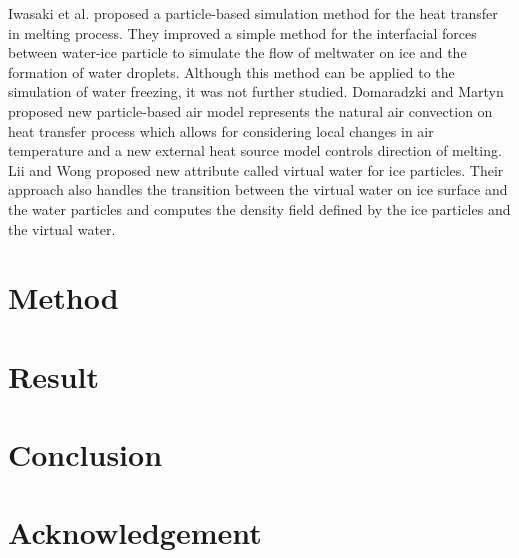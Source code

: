 \documentclass[10pt, twocolumn] {IEEEtran}
\begin{document}
 Iwasaki et al.\cite{iwasaki2010fast} proposed a particle-based simulation method for the heat transfer in melting process. They improved a simple method for the interfacial forces between water-ice particle to simulate the flow of meltwater on ice and the formation of water droplets. Although this method can be applied to the simulation of water freezing, it was not further studied.
 Domaradzki and Martyn\cite{domaradzki2014improved} proposed new particle-based air model represents the natural air convection on heat transfer process  which allows for considering  local changes in air temperature and a new external heat source model controls direction of melting.
 Lii and Wong\cite{lii2014ice} proposed new attribute called virtual water for ice particles. Their approach also handles the transition between the virtual water on ice surface and the water particles and computes the density field defined by the ice particles and the virtual water.

\section{Method}
\section{Result}
\section{Conclusion}
\section{Acknowledgement}

\nocite{*}


\end{document}

